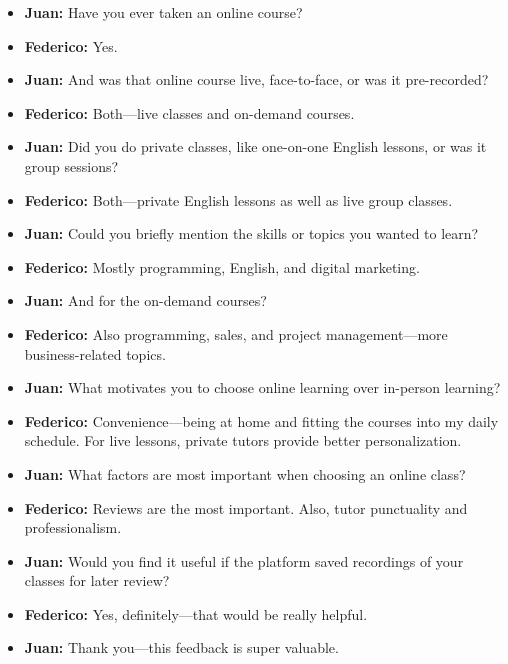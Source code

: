 \begin{enumerate}
\begin{itemize}
        \item \textbf{Juan:} Have you ever taken an online course?

        \item \textbf{Federico:} Yes.

        \item \textbf{Juan:} And was that online course live, face-to-face, or was it pre-recorded?

        \item \textbf{Federico:} Both—live classes and on-demand courses.

        \item \textbf{Juan:} Did you do private classes, like one-on-one English lessons, or was it group sessions?

        \item \textbf{Federico:} Both—private English lessons as well as live group classes.

        \item \textbf{Juan:} Could you briefly mention the skills or topics you wanted to learn?

        \item \textbf{Federico:} Mostly programming, English, and digital marketing.

        \item \textbf{Juan:} And for the on-demand courses?

        \item \textbf{Federico:} Also programming, sales, and project management—more business-related topics.

        \item \textbf{Juan:} What motivates you to choose online learning over in-person learning?

        \item \textbf{Federico:} Convenience—being at home and fitting the courses into my daily schedule.
        For live lessons, private tutors provide better personalization.

        \item \textbf{Juan:} What factors are most important when choosing an online class?

        \item \textbf{Federico:} Reviews are the most important.
        Also, tutor punctuality and professionalism.

        \item \textbf{Juan:} Would you find it useful if the platform saved recordings of your classes for later review?

        \item \textbf{Federico:} Yes, definitely—that would be really helpful.

        \item \textbf{Juan:} Thank you—this feedback is super valuable.

    \end{itemize}


\end{enumerate}
